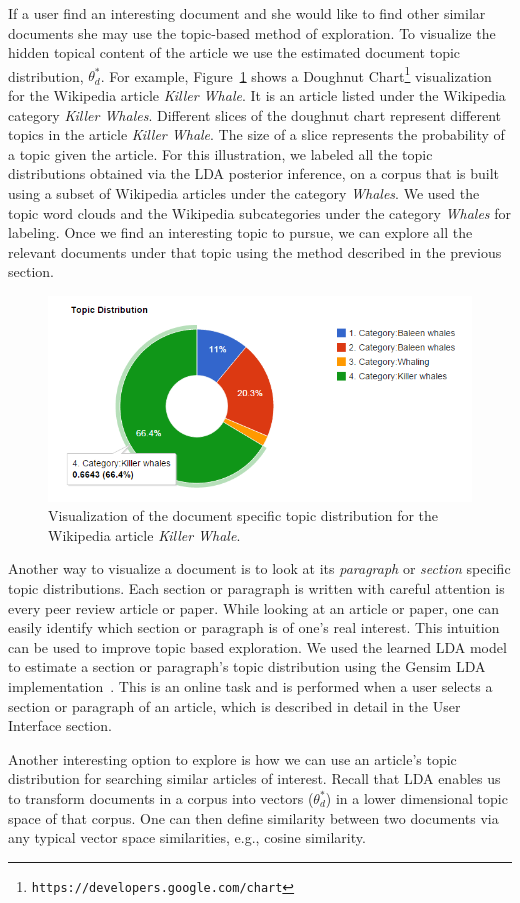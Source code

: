 If a user find an interesting document and she would like to
find other similar documents she may use the topic-based method of exploration.
To visualize the hidden topical content of the article we use the 
estimated document topic distribution, $\theta^*_{d}$.
For example, Figure~\ref{fig:doc-topic-distribution} shows a Doughnut  
Chart\footnote{\texttt{https://developers.google.com/chart}} 
visualization for the Wikipedia article \textit{Killer Whale}.
It is an article listed under the Wikipedia category          
\textit{Killer Whales}. Different slices of the doughnut chart represent
different topics in the article \textit{Killer Whale}. The size 
of a slice represents the probability of a topic given the article. 
For this illustration, we labeled all the topic 
distributions obtained via the LDA posterior inference, on a 
corpus that is built using a subset of Wikipedia articles under the 
category \textit{Whales}. We used the topic word clouds 
and the Wikipedia subcategories under the category \textit{Whales} 
for labeling. Once we find an interesting topic to pursue, we can 
explore all the relevant documents under that topic using the 
method described in the previous section. 

\begin{figure}[htb]\centering 
\includegraphics[width=.45\textwidth]{images/doc_topic_distribution.png}
\caption{Visualization of the document specific topic distribution 
for the Wikipedia article \textit{Killer Whale}.}
\label{fig:doc-topic-distribution}
\end{figure}

Another way to visualize a document is to look at its 
\textsl{paragraph} or \textsl{section} specific topic distributions. 
Each section or paragraph is written with careful attention is every 
peer review article or paper. While looking at an article or paper,  
one can easily identify which section or paragraph is of one's real 
interest. This intuition can be used to improve topic based 
exploration. We used the learned LDA model to 
estimate a section or paragraph's topic distribution using the
Gensim LDA implementation~\cite{rehurek_lrec}. This is an 
online task and is performed when a user selects a section or 
paragraph of an article, which is described in detail in the \system 
User Interface section.


Another interesting option to explore is how we can use an article's 
topic distribution for searching similar articles of interest. 
Recall that LDA enables us to transform documents in a corpus into 
vectors ($\theta^*_{d}$) in a lower dimensional topic space 
of that corpus. One can then define similarity between two documents 
via any typical vector space similarities, e.g., cosine similarity. 

